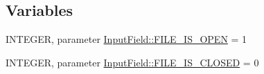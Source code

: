 \subsection*{Variables}
\begin{DoxyCompactItemize}
\item 
INTEGER, parameter \hyperlink{namespace_input_field_ac271f9951500fb53f89b59f48c60e4d9}{InputField::FILE\_\-IS\_\-OPEN} = 1
\item 
INTEGER, parameter \hyperlink{namespace_input_field_a1408d7aae417ece86cc598019d1e5ff9}{InputField::FILE\_\-IS\_\-CLOSED} = 0
\end{DoxyCompactItemize}
